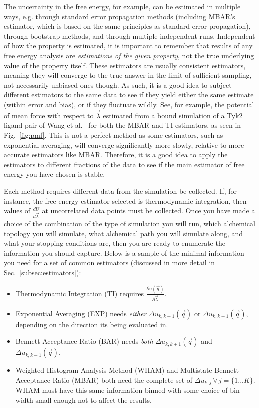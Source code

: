 \documentclass[9pt,bestpractices]{livecoms}
\begin{document}
The uncertainty in the free energy, for example, can be estimated in multiple ways, e.g. through standard error propagation methods (including MBAR's estimator, which is based on the same principles as standard error propagation), through bootstrap methods, and through multiple independent runs. 
Independent of how the property is estimated, it is important to remember that results of any free energy analysis are \textit{estimations of the given property}, not the true underlying value of the property itself. 
These estimators are usually consistent estimators, meaning they will converge to the true answer in the limit of sufficient sampling, not necessarily unbiased ones though.
As such, it is a good idea to subject different estimators to the same data to see if they yield either the same estimate (within error and bias), or if they fluctuate wildly. See, for example, the potential of mean force with respect to $\vec{\lambda}$ estimated from a bound simulation of a Tyk2 ligand pair of Wang et al.~\cite{wang2015accurate} for both the MBAR and TI estimators, as seen in Fig.~\ref{fig:pmf}.
This is not a perfect method as some estimators, such as exponential averaging, will converge significantly more slowly, relative to more accurate estimators like MBAR. 
Therefore, it is a good idea to apply the estimators to different fractions of the data to see if the main estimator of free energy you have chosen is stable.

Each method requires different data from the simulation be collected. If, for instance, the free energy estimator selected is thermodynamic integration, then values of $\frac{dU}{d\vec{\lambda}}$ at uncorrelated data points must be collected. Once you have made a choice of the combination of the type of simulation you will run, which alchemical topology you will simulate, what alchemical path you will simulate along, and what your stopping conditions are, then you are ready to enumerate the information you should capture. Below is a sample of the minimal information you need for a set of common estimators (discussed in more detail in Sec.~\ref{subsec:estimators}):

\begin{itemize}
    \item Thermodynamic Integration (TI) requires $\frac{\partial u(\vec{q})}{\partial\vec{\lambda}}$.
    \item Exponential Averaging (EXP) needs \textit{either} $\Delta u_{k,k+1}(\vec{q})$ or $\Delta u_{k,k-1}(\vec{q})$, depending on the direction its being evaluated in.
    \item Bennett Acceptance Ratio (BAR) needs \textit{both} $\Delta u_{k,k+1}(\vec{q})$ and $\Delta u_{k,k-1}(\vec{q})$.
    \item Weighted Histogram Analysis Method (WHAM) and Multistate Bennett Acceptance Ratio (MBAR) both need the complete set of $\Delta u_{k,j} \, \forall \, j=\{1...K\}$. WHAM must have this same information binned with some choice of bin width small enough not to affect the results.
\end{itemize}
\end{document}
